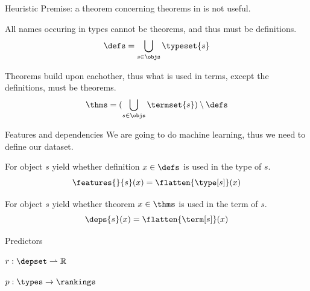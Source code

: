 \begin{frame}{Heuristic}
	Premise: a theorem concerning theorems in \coq is not useful.
	\bigskip
	\begin{definition}[$\defs$]
		All names occuring in types cannot be theorems, and thus must be definitions.
		\[ \defs = \bigcup_{s \in \objs} \typeset{s} \]
	\end{definition}
	\bigskip
	\begin{definition}[$\thms$]
		Theorems build upon eachother, thus what is used in terms, except the definitions, must be theorems.
		\[ \thms = (\bigcup_{s \in \objs} \termset{s}) \setminus \defs \]
	\end{definition}
\end{frame}

\begin{frame}{Features and dependencies}
	We are going to do machine learning, thus we need to define our dataset.
	\bigskip
	\begin{definition}[Features]
		For object $s$ yield whether definition $x \in \defs$ is used in the type of $s$.
		\[ \features{}{s}(x) = \flatten{\type[s]}(x) \]
	\end{definition}
	\bigskip
	\begin{definition}[Dependencies]
		For object $s$ yield whether theorem $x \in \thms$ is used in the term of $s$.
		\[ \deps{s}(x) = \flatten{\term[s]}(x) \]
	\end{definition}
\end{frame}

\begin{frame}{Predictors}
	\begin{definition}
		$ r : \depset \rightharpoonup \mathbb{R} $
	\end{definition}
	\bigskip
	\begin{definition}
		$ p : \types \rightarrow \rankings $
	\end{definition}
\end{frame}

